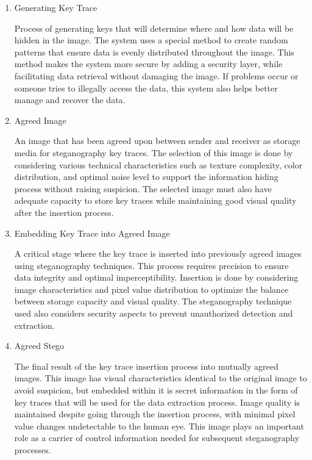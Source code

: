 \documentclass{ittelkom}
\begin{document}
\begin{enumerate}
    \item Generating Key Trace

          Process of generating keys that will determine where and how data will be
          hidden in the image. The system uses a special method to create random patterns
          that ensure data is evenly distributed throughout the image. This method makes
          the system more secure by adding a security layer, while facilitating data
          retrieval without damaging the image. If problems occur or someone tries to
          illegally access the data, this system also helps better manage and recover the
          data.

    \item Agreed Image

          An image that has been agreed upon between sender and receiver as storage media
          for steganography key traces. The selection of this image is done by
          considering various technical characteristics such as texture complexity, color
          distribution, and optimal noise level to support the information hiding process
          without raising suspicion. The selected image must also have adequate capacity
          to store key traces while maintaining good visual quality after the insertion
          process.

    \item Embedding Key Trace into Agreed Image

          A critical stage where the key trace is inserted into previously agreed images
          using steganography techniques. This process requires precision to ensure data
          integrity and optimal imperceptibility. Insertion is done by considering image
          characteristics and pixel value distribution to optimize the balance between
          storage capacity and visual quality. The steganography technique used also
          considers security aspects to prevent unauthorized detection and extraction.

    \item Agreed Stego

          The final result of the key trace insertion process into mutually agreed
          images. This image has visual characteristics identical to the original image
          to avoid suspicion, but embedded within it is secret information in the form of
          key traces that will be used for the data extraction process. Image quality is
          maintained despite going through the insertion process, with minimal pixel
          value changes undetectable to the human eye. This image plays an important role
          as a carrier of control information needed for subsequent steganography
          processes.


\end{enumerate}
\end{document}
